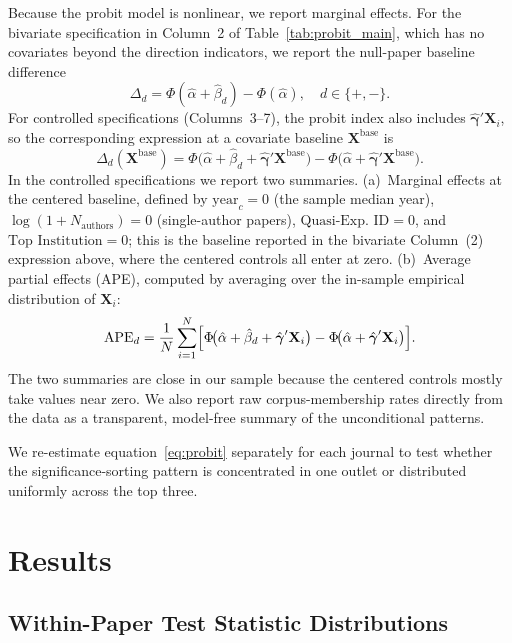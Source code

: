 \documentclass[12pt]{article}
\begin{document}
Because the probit model is nonlinear, we report marginal effects.  For
the bivariate specification in Column~2 of Table~\ref{tab:probit_main},
which has no covariates beyond the direction indicators, we report the
null-paper baseline difference
\[
  \Delta_d = \Phi(\hat\alpha + \hat\beta_d) - \Phi(\hat\alpha),
  \quad d \in \{+, -\}.
\]
For controlled specifications (Columns~3--7), the probit index also
includes $\hat{\boldsymbol{\gamma}}'\mathbf{X}_i$, so the corresponding
expression at a covariate baseline $\mathbf{X}^{\mathrm{base}}$ is
\[
  \Delta_d(\mathbf{X}^{\mathrm{base}}) =
  \Phi\!\bigl(\hat\alpha + \hat\beta_d
              + \hat{\boldsymbol{\gamma}}'\mathbf{X}^{\mathrm{base}}\bigr)
  - \Phi\!\bigl(\hat\alpha
              + \hat{\boldsymbol{\gamma}}'\mathbf{X}^{\mathrm{base}}\bigr).
\]
In the controlled specifications we report two summaries.  (a)~Marginal
effects at the centered baseline, defined by $\text{year}_c = 0$ (the
sample median year), $\log(1+N_{\text{authors}}) = 0$ (single-author
papers), $\text{Quasi-Exp.\ ID} = 0$, and $\text{Top Institution} = 0$;
this is the baseline reported in the bivariate Column~(2) expression
above, where the centered controls all enter at zero.  (b)~Average
partial effects (APE), computed by averaging over the in-sample empirical
distribution of $\mathbf{X}_i$:
\[
  \text{APE}_d = \frac{1}{N}\sum_{i=1}^{N}
  \Bigl[
    \Phi\!\bigl(\hat\alpha + \hat\beta_d + \hat{\boldsymbol{\gamma}}'\mathbf{X}_i\bigr)
    - \Phi\!\bigl(\hat\alpha + \hat{\boldsymbol{\gamma}}'\mathbf{X}_i\bigr)
  \Bigr].
\]
The two summaries are close in our sample because the centered controls
mostly take values near zero.  We also report raw corpus-membership rates
directly from the data as a transparent, model-free summary of the
unconditional patterns.

We re-estimate equation~\eqref{eq:probit} separately for each journal to test
whether the significance-sorting pattern is concentrated in one outlet or
distributed uniformly across the top three.

\section{Results}
\label{sec:results}


\subsection{Within-Paper Test Statistic Distributions}
\label{subsec:pvalue_dist}
\end{document}
